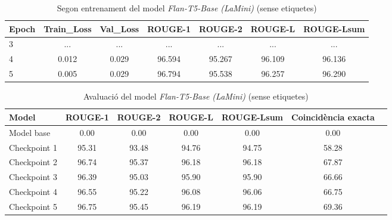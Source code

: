 \begin{table}[H]
    \centering
    \begin{tabular}{lcccccc}
    \toprule
    Epoch & Train\_Loss & Val\_Loss & ROUGE-1 & ROUGE-2 & ROUGE-L & ROUGE-Lsum \\
    \midrule
    3 & ...  & ...    & ...    & ...    & ...    & ... \\
    4 & 0.012 & 0.029 & 96.594 & 95.267 & 96.109 & 96.136 \\
    5 & 0.005 & 0.029 & 96.794 & 95.538 & 96.257 & 96.290 \\
    \bottomrule
    \end{tabular}
    \caption[Segon entrenament del model \textit{Flan-T5-Base (LaMini)}]{Segon entrenament del model \textit{Flan-T5-Base (LaMini)} (sense etiquetes)}
\end{table}

\begin{table}[H]
    \centering
    \begin{tabular}{lcccccc}
    \toprule
    Model & ROUGE-1 & ROUGE-2 & ROUGE-L & ROUGE-Lsum & Coincidència exacta \\
    \midrule
    Model base   & 0.00  & 0.00  & 0.00  & 0.00  & 0.00 \\
    Checkpoint 1 & 95.31 & 93.48 & 94.76 & 94.75 & 58.28 \\
    Checkpoint 2 & 96.74 & 95.37 & 96.18 & 96.18 & 67.87 \\
    Checkpoint 3 & 96.39 & 95.03 & 95.90 & 95.90 & 66.66 \\
    Checkpoint 4 & 96.55 & 95.22 & 96.08 & 96.06 & 66.75 \\
    Checkpoint 5 & 96.75 & 95.45 & 96.19 & 96.19 & 69.36 \\
    \bottomrule
    \end{tabular}
    \caption[Avaluació del model \textit{Flan-T5-Base (LaMini)}]{Avaluació del model \textit{Flan-T5-Base (LaMini)} (sense etiquetes)}
\end{table}






